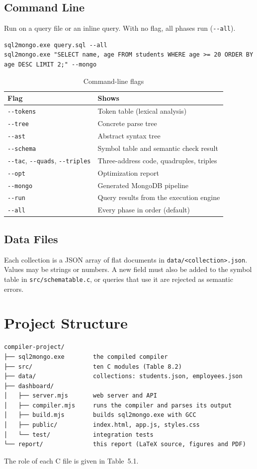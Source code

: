 \documentclass[12pt,a4paper]{report}
\newcommand{\codeus}{\textunderscore\allowbreak}
\DeclareRobustCommand{\code}[1]{\texttt{\let\_\codeus #1}}
\begin{document}
\section{Command Line}
Run on a query file or an inline query. With no flag, all phases run (\code{-{}-all}).
\begin{lstlisting}
sql2mongo.exe query.sql --all
sql2mongo.exe "SELECT name, age FROM students WHERE age >= 20 ORDER BY age DESC LIMIT 2;" --mongo
\end{lstlisting}
\begin{table}[H]
\centering\small
\begin{tabular}{|l|l|}
\hline
\textbf{Flag} & \textbf{Shows} \\ \hline
\code{-{}-tokens} & Token table (lexical analysis) \\ \hline
\code{-{}-tree} & Concrete parse tree \\ \hline
\code{-{}-ast} & Abstract syntax tree \\ \hline
\code{-{}-schema} & Symbol table and semantic check result \\ \hline
\code{-{}-tac}, \code{-{}-quads}, \code{-{}-triples} & Three-address code, quadruples, triples \\ \hline
\code{-{}-opt} & Optimization report \\ \hline
\code{-{}-mongo} & Generated MongoDB pipeline \\ \hline
\code{-{}-run} & Query results from the execution engine \\ \hline
\code{-{}-all} & Every phase in order (default) \\ \hline
\end{tabular}
\caption{Command-line flags}
\end{table}

\section{Data Files}
Each collection is a JSON array of flat documents in \code{data/<collection>.json}. Values may be strings or numbers. A new field must also be added to the symbol table in \code{src/schema\_table.c}, or queries that use it are rejected as semantic errors.

\chapter{Project Structure}
\begin{Verbatim}
compiler-project/
├── sql2mongo.exe        the compiled compiler
├── src/                 ten C modules (Table 8.2)
├── data/                collections: students.json, employees.json
├── dashboard/
│   ├── server.mjs       web server and API
│   ├── compiler.mjs     runs the compiler and parses its output
│   ├── build.mjs        builds sql2mongo.exe with GCC
│   ├── public/          index.html, app.js, styles.css
│   └── test/            integration tests
└── report/              this report (LaTeX source, figures and PDF)
\end{Verbatim}
The role of each C file is given in Table~5.1.
\end{document}
